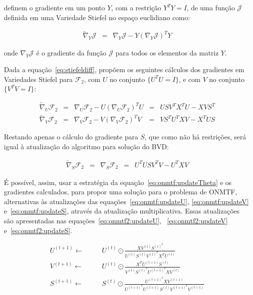 \documentclass[
    12pt,                %
    oneside,            %
    a4paper,            %
    english,            %
    brazil                %
    ]{abntex2ppgsi}
\begin{document}
 definem o gradiente em um ponto $Y$, com a restrição $Y^T Y = I$, de uma função $\mathcal{J}$ definida em uma Variedade Stiefel no espaço euclidiano como:

\begin{equation}
\label{eq:stiefeldiff}
    \begin{array}{lclcl}
        {\tilde \nabla}_Y \mathcal{J} & = & \nabla_Y \mathcal{J} - Y (\nabla_Y \mathcal{J})^T Y
    \end{array}
\end{equation}

onde $\nabla_Y \mathcal{J}$ é o gradiente da função $\mathcal{J}$ para todos os elementos da matriz $Y$.

Dada a equação~\ref{eq:stiefeldiff},  propõem os seguintes cálculos dos gradientes em Variedades Stiefel para $\mathcal{F}_2$, com $U$ no conjunto $\{ U^T U = I \}$, e com $V$ no conjunto $\{ V^T V = I \}$:

\[
    \begin{array}{lclclclcl}
        {\tilde \nabla_U} \mathcal{F}_2 & = & \nabla_U \mathcal{F}_2 - U (\nabla_U \mathcal{F}_2)^T U & = & U S V^T X^T U - X V S^T \\
        {\tilde \nabla_V} \mathcal{F}_2 & = & \nabla_V \mathcal{F}_2 - V (\nabla_V \mathcal{F}_2)^T V & = & V S^T U^T X V - X^T U S
    \end{array}
\]

Restando apenas o cálculo do gradiente para $S$, que como não há restrições, será igual à atualização do algoritmo para solução do BVD:

\[
    \begin{array}{lclcl}
        {\tilde \nabla_S} \mathcal{F}_2 & = & \nabla_S \mathcal{F}_2 & = & U^T U S V^T V - U^T X V
    \end{array}
\]

É possível, assim, usar a estratégia da equação~\ref{eq:onmtf:updateTheta} e os gradientes calculados, para propor uma solução para o problema de ONMTF, alternativas às atualizações das equações~\ref{eq:onmtf:updateU}, \ref{eq:onmtf:updateV} e~\ref{eq:onmtf:updateS}, através da atualização multiplicativa.
Essas atualizações são apresentadas nas equações~\ref{eq:onmtf2:updateU}, ~\ref{eq:onmtf2:updateV} e~\ref{eq:onmtf2:updateS}.

\begin{subequations}
    \begin{alignat}{2}
        U^{(t+1)} \gets \quad && U^{(t)} \odot \frac{ X V^{(t)} S^{(t)^T} }{ U^{(t)} S^{(t)} V^{(t)^T} X^T U^{(t)} }                   \label{eq:onmtf2:updateU} \\
        V^{(t+1)} \gets \quad && U^{(t)} \odot \frac{ X^T U^{(t+1)} S^{(t)} }{ V^{(t)} S^{(t)^T} U^{(t+1)^T} X V^{(t)} }               \label{eq:onmtf2:updateV} \\
        S^{(t+1)} \gets \quad && S^{(t)} \odot \frac{ U^{(t+1)^T} X V^{(t+1)} }{ U^{(t+1)^T} U^{(t+1)} S^{(t)} V^{(t+1)^T} V^{(t+1)} } \label{eq:onmtf2:updateS}
    \end{alignat}
\end{subequations}
\end{document}
